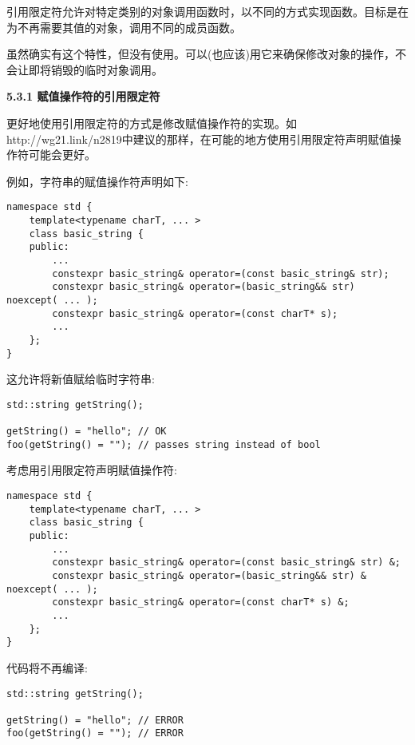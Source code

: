 引用限定符允许对特定类别的对象调用函数时，以不同的方式实现函数。目标是在为不再需要其值的对象，调用不同的成员函数。\par

虽然确实有这个特性，但没有使用。可以(也应该)用它来确保修改对象的操作，不会让即将销毁的临时对象调用。\par

\hspace*{\fill} \par %
\textbf{5.3.1 赋值操作符的引用限定符}

更好地使用引用限定符的方式是修改赋值操作符的实现。如http://wg21.link/n2819中建议的那样，在可能的地方使用引用限定符声明赋值操作符可能会更好。\par

例如，字符串的赋值操作符声明如下:\par

\begin{lstlisting}[caption={}]
namespace std {
	template<typename charT, ... >
	class basic_string {
	public:
		...
		constexpr basic_string& operator=(const basic_string& str);
		constexpr basic_string& operator=(basic_string&& str) noexcept( ... );
		constexpr basic_string& operator=(const charT* s);
		...
	};
}
\end{lstlisting}

这允许将新值赋给临时字符串:\par

\begin{lstlisting}[caption={}]
std::string getString();

getString() = "hello"; // OK
foo(getString() = ""); // passes string instead of bool
\end{lstlisting}

考虑用引用限定符声明赋值操作符:\par

\begin{lstlisting}[caption={}]
namespace std {
	template<typename charT, ... >
	class basic_string {
	public:
		...
		constexpr basic_string& operator=(const basic_string& str) &;
		constexpr basic_string& operator=(basic_string&& str) & noexcept( ... );
		constexpr basic_string& operator=(const charT* s) &;
		...
	};
}
\end{lstlisting}

代码将不再编译:\par

\begin{lstlisting}[caption={}]
std::string getString();

getString() = "hello"; // ERROR
foo(getString() = ""); // ERROR
\end{lstlisting}

